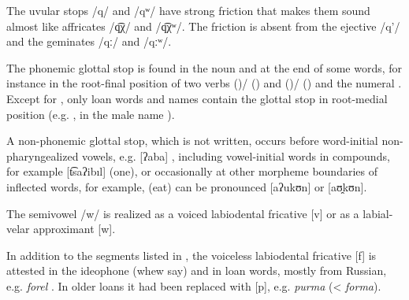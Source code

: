 The uvular stops /q/ and /qʷ/ have strong friction that makes them sound almost like affricates /q͡χ/ and /q͡χʷ/. The friction is absent from the ejective /q'/ and the geminates /qː/ and /qːʷ/.

The phonemic glottal stop is found in the noun   and at the end of some words, for instance in the root-final position of two verbs  ()\slash{} ()  and  ()\slash{} ()  and the numeral  . Except for  , only loan words and names contain the glottal stop in root-medial position (e.g.  , in the male name ).

A non-phonemic glottal stop, which is not written, occurs before word-initial non-pharyngealized vowels, e.g.  [ʔaba] , including vowel-initial words in compounds, for example  [t͡saʔibıl]  (one), or occasionally at other morpheme boundaries of inflected words, for example,    (eat) can be pronounced [aʔukʊn] or [aʊ̯kʊn].

The semivowel /w/ is realized as a voiced labiodental fricative [v] or as a labial-velar approximant [w]. 

In addition to the segments listed in , the voiceless labiodental fricative [f] is attested in the ideophone   (whew say) and in loan words, mostly from Russian, e.g. \textit{forel} . In older loans it had been replaced with [p], e.g. \textit{purma}  (< \textit{forma}).

